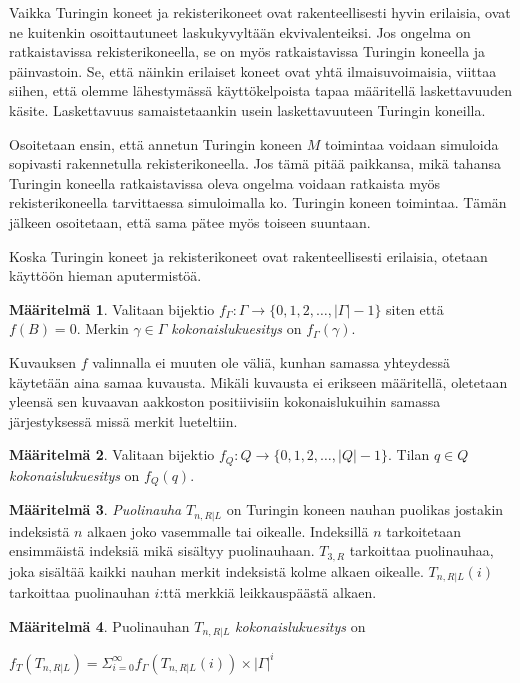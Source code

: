 \documentclass[a4paper, 12pt]{article}
\theoremstyle{definition}
\newtheorem{mydef}{Määritelmä}
\theoremstyle{plain}
\begin{document}
Vaikka Turingin koneet ja rekisterikoneet ovat rakenteellisesti hyvin erilaisia, ovat ne kuitenkin osoittautuneet laskukyvyltään ekvivalenteiksi. Jos ongelma on ratkaistavissa rekisterikoneella, se on myös ratkaistavissa Turingin koneella ja päinvastoin. Se, että näinkin erilaiset koneet ovat yhtä ilmaisuvoimaisia, viittaa siihen, että olemme lähestymässä käyttökelpoista tapaa määritellä laskettavuuden käsite. Laskettavuus samaistetaankin usein laskettavuuteen Turingin koneilla.

Osoitetaan ensin, että annetun Turingin koneen $M$ toimintaa voidaan simuloida sopivasti rakennetulla rekisterikoneella. Jos tämä pitää paikkansa, mikä tahansa Turingin koneella ratkaistavissa oleva ongelma voidaan ratkaista myös rekisterikoneella tarvittaessa simuloimalla ko. Turingin koneen toimintaa. Tämän jälkeen osoitetaan, että sama pätee myös toiseen suuntaan.

Koska Turingin koneet ja rekisterikoneet ovat rakenteellisesti erilaisia, otetaan käyttöön hieman aputermistöä.

\begin{mydef}
\label{def:fgamma}
Valitaan bijektio $f_\Gamma : \Gamma \rightarrow \{0, 1, 2, \ldots, |\Gamma| - 1\}$ siten että $f(B) = 0$. Merkin $\gamma \in \Gamma$ \emph{kokonaislukuesitys} on $f_\Gamma(\gamma)$.
\end{mydef}
Kuvauksen $f$ valinnalla ei muuten ole väliä, kunhan samassa yhteydessä käytetään aina samaa kuvausta. Mikäli kuvausta ei erikseen määritellä, oletetaan yleensä sen kuvaavan aakkoston positiivisiin kokonaislukuihin samassa järjestyksessä missä merkit lueteltiin.

\begin{mydef}
\label{def:fq}
Valitaan bijektio $f_Q : Q \rightarrow \{0, 1, 2, \ldots, |Q| - 1\}$. Tilan $q \in Q$ \emph{kokonaislukuesitys} on $f_Q(q)$.
\end{mydef}

\begin{mydef}
\emph{Puolinauha} $T_{n, R | L}$ on Turingin koneen nauhan puolikas jostakin indeksistä $n$ alkaen joko vasemmalle tai oikealle. Indeksillä $n$ tarkoitetaan ensimmäistä indeksiä mikä sisältyy puolinauhaan. $T_{3, R}$ tarkoittaa puolinauhaa, joka sisältää kaikki nauhan merkit indeksistä kolme alkaen oikealle. $T_{n, R | L}(i)$ tarkoittaa puolinauhan $i$:ttä merkkiä leikkauspäästä alkaen.
\end{mydef}

\begin{mydef}
Puolinauhan $T_{n, R | L}$ \emph{kokonaislukuesitys} on 
\begin{center}
\begin{math}
f_T(T_{n, R | L}) = \Sigma_{i=0}^{\infty} f_\Gamma(T_{n, R | L}(i)) \times |\Gamma|^i
\end{math}
\end{center}
\end{mydef}
\end{document}
